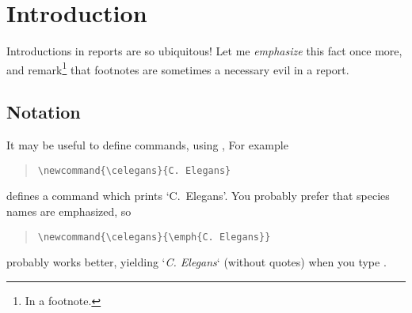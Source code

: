 \chapter{Introduction}

Introductions in reports are so ubiquitous! Let me \emph{emphasize} this fact once more,
and remark\footnote{In a footnote.} that footnotes are sometimes a necessary evil in a report.

\section{Notation}

It may be useful to define commands, using ,
For example
\begin{quote}
  \verb!\newcommand{\celegans}{C. Elegans}!
\end{quote}
defines a command  which prints `C.\ Elegans'.
You probably prefer that species names are emphasized, so
\begin{quote}
  \verb!\newcommand{\celegans}{\emph{C. Elegans}}!
\end{quote}
probably works better, yielding `\emph{C. Elegans}` (without quotes)
when you type .
